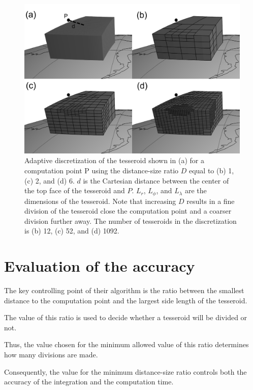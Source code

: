 \documentclass[manuscript]{geophysics}
\begin{document}
\begin{figure}
    \centering
    \includegraphics{figs/tesseroid-split}
    \caption{
        Adaptive discretization
        of the tesseroid shown in (a)
        for a computation point P
        using the distance-size ratio $D$ equal to
        (b) 1, (c) 2, and (d) 6.
        $d$ is the Cartesian distance between
        the center of the top face of the tesseroid
        and $P$.
        $L_r$, $L_\phi$, and $L_\lambda$ are the dimensions of the tesseroid.
        Note that increasing $D$
        results in a fine division of the tesseroid
        close the computation point
        and a coarser division further away.
        The number of tesseroids in the discretization is (b) 12, (c) 52,
        and (d) 1092.
    }
    \label{fig:division}
\end{figure}


\section{Evaluation of the accuracy}

The key controlling point of their algorithm is the ratio between
the smallest distance to the computation point and
the largest side length of the tesseroid.

The value of this ratio is used to decide whether a tesseroid will be divided
or not.

Thus, the value chosen for the minimum allowed value of this ratio determines
how many divisions are made.

Consequently, the value for the minimum distance-size ratio controls both the
accuracy of the integration and the computation time.
\end{document}
